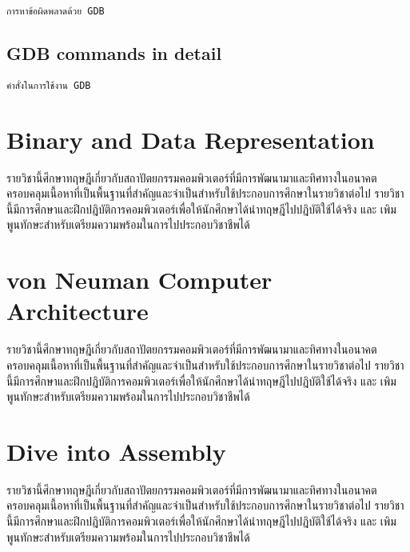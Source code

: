 \documentclass[
  notoc %
]{tufte-book}
\begin{document}
\begin{lstlisting}
การหาข้อผิดพลาดด้วย GDB
\end{lstlisting}

\hypertarget{sec:GDB-commands}{%
\section{GDB commands in detail}\label{sec:GDB-commands}}

\begin{lstlisting}
คำสั่งในการใช้งาน GDB
\end{lstlisting}

\hypertarget{sec:bidatarep}{%
\chapter{Binary and Data Representation}\label{sec:bidatarep}}

รายวิชานี้ศึกษาทฤษฎีเกี่ยวกับสถาปัตยกรรมคอมพิวเตอร์ที่มีการพัฒนามาและทิศทางในอนาคต
ครอบคลุมเนื้อหาที่เป็นพื้นฐานที่สำคัญและจำเป็นสำหรับใช้ประกอบการศึกษาในรายวิชาต่อไป
รายวิชานี้มีการศึกษาและฝึกปฎิบัติการคอมพิวเตอร์เพื่อให้นักศึกษาได้นำทฤษฎีไปปฎิบัติใช้ได้จริง
และ เพิมพูนทักษะสำหรับเตรียมความพร้อมในการไปประกอบวิชาชีพได้

\hypertarget{sec:neumancomparch}{%
\chapter{von Neuman Computer Architecture}\label{sec:neumancomparch}}

รายวิชานี้ศึกษาทฤษฎีเกี่ยวกับสถาปัตยกรรมคอมพิวเตอร์ที่มีการพัฒนามาและทิศทางในอนาคต
ครอบคลุมเนื้อหาที่เป็นพื้นฐานที่สำคัญและจำเป็นสำหรับใช้ประกอบการศึกษาในรายวิชาต่อไป
รายวิชานี้มีการศึกษาและฝึกปฎิบัติการคอมพิวเตอร์เพื่อให้นักศึกษาได้นำทฤษฎีไปปฎิบัติใช้ได้จริง
และ เพิมพูนทักษะสำหรับเตรียมความพร้อมในการไปประกอบวิชาชีพได้

\hypertarget{sec:diveintoassembly}{%
\chapter{Dive into Assembly}\label{sec:diveintoassembly}}

รายวิชานี้ศึกษาทฤษฎีเกี่ยวกับสถาปัตยกรรมคอมพิวเตอร์ที่มีการพัฒนามาและทิศทางในอนาคต
ครอบคลุมเนื้อหาที่เป็นพื้นฐานที่สำคัญและจำเป็นสำหรับใช้ประกอบการศึกษาในรายวิชาต่อไป
รายวิชานี้มีการศึกษาและฝึกปฎิบัติการคอมพิวเตอร์เพื่อให้นักศึกษาได้นำทฤษฎีไปปฎิบัติใช้ได้จริง
และ เพิมพูนทักษะสำหรับเตรียมความพร้อมในการไปประกอบวิชาชีพได้
\end{document}
